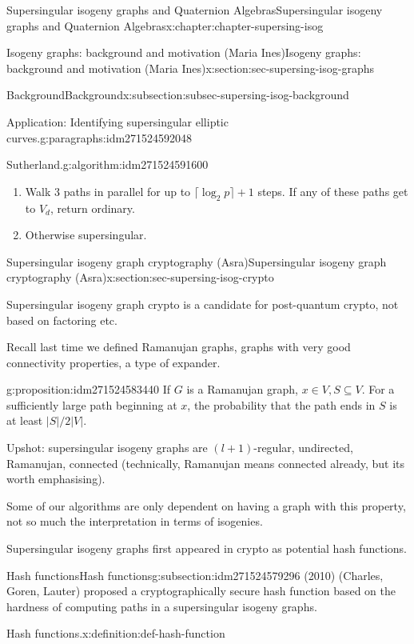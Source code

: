\documentclass[oneside,10pt,]{book}
\numberwithin{equation}{section}
\begin{document}
\begin{chapterptx}{Supersingular isogeny graphs and Quaternion Algebras}{}{Supersingular isogeny graphs and Quaternion Algebras}{}{}{x:chapter:chapter-supersing-isog}
\begin{sectionptx}{Isogeny graphs: background and motivation (Maria Ines)}{}{Isogeny graphs: background and motivation (Maria Ines)}{}{}{x:section:sec-supersing-isog-graphs}
\begin{subsectionptx}{Background}{}{Background}{}{}{x:subsection:subsec-supersing-isog-background}
\begin{paragraphs}{Application: Identifying supersingular elliptic curves.}{g:paragraphs:idm271524592048}
\begin{algorithm}{Sutherland.}{}{g:algorithm:idm271524591600}
\begin{enumerate}
\item{}Walk 3 paths in parallel for up to \(\lceil \log_2 p \rceil + 1 \) steps. If any of these paths get to \(V_d\), return ordinary.%
\item{}Otherwise supersingular.%
\end{enumerate}
%
\end{algorithm}
\end{paragraphs}%
\end{subsectionptx}
\end{sectionptx}
%
%
\typeout{************************************************}
\typeout{************************************************}
%
\begin{sectionptx}{Supersingular isogeny graph cryptography (Asra)}{}{Supersingular isogeny graph cryptography (Asra)}{}{}{x:section:sec-supersing-isog-crypto}
\begin{introduction}{}%
Supersingular isogeny graph crypto is a candidate for post-quantum crypto, not based on factoring etc.%
\par
Recall last time we defined Ramanujan graphs, graphs with very good connectivity properties, a type of expander.%
\begin{proposition}{}{}{g:proposition:idm271524583440}%
If \(G\) is a Ramanujan graph, \(x\in V, S\subseteq V\). For a sufficiently large path beginning at \(x\), the probability that the path ends in \(S\) is at least \(|S|/2|V|\).%
\end{proposition}
Upshot: supersingular isogeny graphs are \((l +1)\)-regular, undirected, Ramanujan, connected (technically, Ramanujan means connected already, but its worth emphasising).%
\par
Some of our algorithms are only dependent on having a graph with this property, not so much the interpretation in terms of isogenies.%
\par
Supersingular isogeny graphs first appeared in crypto as potential hash functions.%
\end{introduction}%
%
%
\typeout{************************************************}
\typeout{************************************************}
%
\begin{subsectionptx}{Hash functions}{}{Hash functions}{}{}{g:subsection:idm271524579296}
(2010) (Charles, Goren, Lauter) proposed a cryptographically secure hash function based on the hardness of computing paths in a supersingular isogeny graphs.%
\begin{definition}{Hash functions.}{x:definition:def-hash-function}%

\end{definition}
\end{subsectionptx}
\end{sectionptx}
\end{chapterptx}
\end{document}
